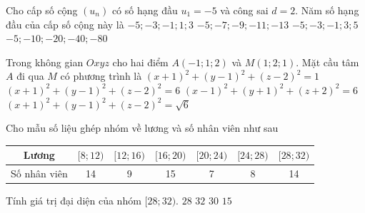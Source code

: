 \begin{ex}%
Cho cấp số cộng $\left(u_n\right)$ có số hạng đầu $u_1=-5$ và công sai $d=2$. Năm số hạng đầu của cấp số cộng này là
\choice
{\True $-5;-3;-1;1;3$}
{$-5;-7;-9;-11;-13$}
{$-5;-3;-1;3;5$}
{$-5;-10;-20;-40;-80$}
\end{ex}

\begin{ex}%
Trong không gian $Oxyz$ cho hai điểm $A(-1;1;2)$ và $M(1;2;1)$. Mặt cầu tâm $A$ đi qua $M$ có phương trình là
\choice
{$(x+1)^2+(y-1)^2+(z-2)^2=1$}
{\True $(x+1)^2+(y-1)^2+(z-2)^2=6$}
{$(x-1)^2+(y+1)^2+(z+2)^2=6$}
{$(x+1)^2+(y-1)^2+(z-2)^2=\sqrt{6}$}
\end{ex}

\begin{ex}%
Cho mẫu số liệu ghép nhóm về lương và số nhân viên như sau
\begin{center}
\begin{tabular}{|c|c|c|c|c|c|c|}
\hline
Lương & $[8;12)$ & $[12;16)$ & $[16;20)$ & $[20;24)$ & $[24;28)$ & $[28;32)$ \\ \hline
Số nhân viên & 14 & 9 & 15 & 7 & 8 & 14 \\ \hline
\end{tabular}
\end{center}
Tính giá trị đại diện của nhóm $[28;32)$.
\choice
{$28$}
{$32$}
{\True $30$}
{$15$}
\loigiai{
Giá trị đại diện của nhóm $[28;32)$ là $\dfrac{28+32}{2}=30$.
}
\end{ex}

